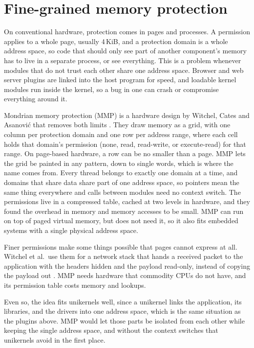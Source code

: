 \documentclass[12pt]{report}
\renewcommand{\_}{\origunderscore\allowbreak}
\begin{document}
\section{Fine-grained memory protection}
\label{sec:related-protection-allocation}
\label{sec:mondrian}
On conventional hardware, protection comes in pages and processes. A permission applies to a whole page, usually 4\,KiB, and a protection domain is a whole address space, so code that should only see part of another component's memory has to live in a separate process, or see everything. This is a problem whenever modules that do not trust each other share one address space. Browser and web server plugins are linked into the host program for speed, and loadable kernel modules run inside the kernel, so a bug in one can crash or compromise everything around it.

Mondrian memory protection (MMP) is a hardware design by Witchel, Cates and Asanovi\'c that removes both limits \cite{witchel2002mondrian}. They draw memory as a grid, with one column per protection domain and one row per address range, where each cell holds that domain's permission (none, read, read-write, or execute-read) for that range. On page-based hardware, a row can be no smaller than a page. MMP lets the grid be painted in any pattern, down to single words, which is where the name comes from. Every thread belongs to exactly one domain at a time, and domains that share data share part of one address space, so pointers mean the same thing everywhere and calls between modules need no context switch. The permissions live in a compressed table, cached at two levels in hardware, and they found the overhead in memory and memory accesses to be small. MMP can run on top of paged virtual memory, but does not need it, so it also fits embedded systems with a single physical address space.

Finer permissions make some things possible that pages cannot express at all. Witchel et al.\ use them for a network stack that hands a received packet to the application with the headers hidden and the payload read-only, instead of copying the payload out \cite{witchel2002mondrian}. MMP needs hardware that commodity CPUs do not have, and its permission table costs memory and lookups.

Even so, the idea fits unikernels well, since a unikernel links the application, its libraries, and the drivers into one address space, which is the same situation as the plugins above. MMP would let those parts be isolated from each other while keeping the single address space, and without the context switches that unikernels avoid in the first place.
\end{document}
